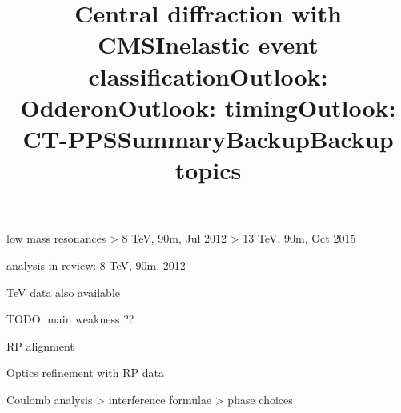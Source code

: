 \centerline{
}


\newpage %
\title{Central diffraction with CMS}

\> low mass resonances
\>> 8 TeV, 90m, Jul 2012
\>> 13 TeV, 90m, Oct 2015


\newpage %
\title{}


\newpage %
\title{}


\newpage %
\title{Inelastic event classification}

\> analysis in review: 8 TeV, 90m, 2012

 TeV data also available

TODO: main weakness ??

\newpage %
\title{}

\newpage %
\title{Outlook: Odderon}


\newpage %
\title{Outlook: timing}


\newpage %
\title{}


\newpage %
\title{Outlook: CT-PPS}


\newpage %
\title{}


\newpage %
\title{Summary}


\newpage %
\hbox{}%
\vfil
\title{Backup}


\newpage %
\title{Backup topics}

\> RP alignment

\> Optics refinement with RP data

\> Coulomb analysis
\>> interference formulae
\>> phase choices

\vfil
\eject
\bye
